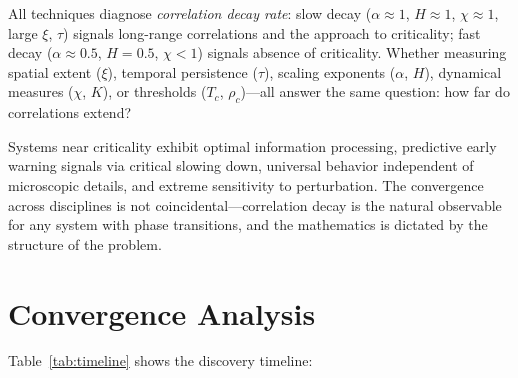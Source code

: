 \documentclass[11pt]{article}
\begin{document}
All techniques diagnose \textit{correlation decay rate}: slow decay ($\alpha \approx 1$, $H \approx 1$, $\chi \approx 1$, large $\xi$, $\tau$) signals long-range correlations and the approach to criticality; fast decay ($\alpha \approx 0.5$, $H = 0.5$, $\chi < 1$) signals absence of criticality. Whether measuring spatial extent ($\xi$), temporal persistence ($\tau$), scaling exponents ($\alpha$, $H$), dynamical measures ($\chi$, $K$), or thresholds ($T_c$, $\rho_c$)---all answer the same question: how far do correlations extend?

Systems near criticality exhibit optimal information processing, predictive early warning signals via critical slowing down, universal behavior independent of microscopic details, and extreme sensitivity to perturbation. The convergence across disciplines is not coincidental---correlation decay is the natural observable for any system with phase transitions, and the mathematics is dictated by the structure of the problem.

\section{Convergence Analysis}
\label{sec:convergence}

Table~\ref{tab:timeline} shows the discovery timeline:
\end{document}
